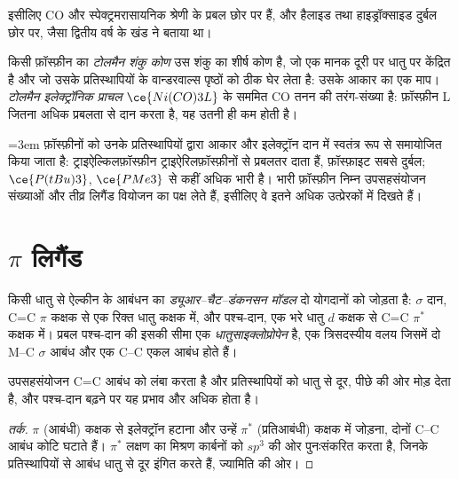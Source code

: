 इसीलिए CO और  स्पेक्ट्रमरासायनिक श्रेणी के प्रबल छोर पर हैं, और
हैलाइड तथा हाइड्रॉक्साइड दुर्बल छोर पर, जैसा द्वितीय वर्ष के खंड ने बताया था।

\begin{definition}[टोलमैन प्राचल]\label{def:b3:organometallic-bonding:tolman}
किसी फ़ॉस्फ़ीन का \emph{टोलमैन शंकु कोण} उस शंकु का शीर्ष
कोण है, जो एक मानक दूरी पर धातु पर केंद्रित है और जो उसके प्रतिस्थापियों के वान्डरवाल्स पृष्ठों को
ठीक घेर लेता है: उसके आकार का एक माप।
\emph{टोलमैन इलेक्ट्रॉनिक प्राचल}
$\ce{Ni(CO)3L}$ के सममित CO तनन की तरंग-संख्या है: फ़ॉस्फ़ीन L जितना अधिक प्रबलता से
दान करता है, यह उतनी ही कम होती है।
\end{definition}

\emergencystretch=3em फ़ॉस्फ़ीनों को उनके प्रतिस्थापियों द्वारा आकार और इलेक्ट्रॉन दान में स्वतंत्र रूप से
समायोजित किया जाता है: ट्राइऐल्किलफ़ॉस्फ़ीन ट्राइऐरिलफ़ॉस्फ़ीनों से प्रबलतर दाता हैं,
फ़ॉस्फ़ाइट सबसे दुर्बल; $\ce{P(tBu)3}$, $\ce{PMe3}$ से कहीं अधिक भारी है। भारी फ़ॉस्फ़ीन
निम्न उपसहसंयोजन संख्याओं और तीव्र लिगैंड वियोजन का पक्ष लेते हैं, इसीलिए वे
इतने अधिक उत्प्रेरकों में दिखते हैं।

\section{$\pi$ लिगैंड}

\begin{definition}[ड्यूआर--चैट--डंकनसन मॉडल]\label{def:b3:organometallic-bonding:dcd}
किसी धातु से ऐल्कीन के आबंधन का \emph{ड्यूआर--चैट--डंकनसन मॉडल}
दो योगदानों को जोड़ता है: $\sigma$ दान, C=C $\pi$ कक्षक से
एक रिक्त धातु कक्षक में, और पश्च-दान, एक भरे धातु $d$ कक्षक से
C=C $\pi^*$ कक्षक में। प्रबल पश्च-दान की इसकी सीमा एक
\emph{धातुसाइक्लोप्रोपेन} है, एक त्रिसदस्यीय वलय
जिसमें दो M--C $\sigma$ आबंध और एक C--C एकल आबंध होते हैं।
\end{definition}

\begin{proposition}[ऐल्कीन में पश्च-दान के परिणाम]\label{prop:b3:organometallic-bonding:dcd}
उपसहसंयोजन C=C आबंध को लंबा करता है और प्रतिस्थापियों को धातु से दूर, पीछे की ओर मोड़
देता है, और पश्च-दान बढ़ने पर यह प्रभाव और अधिक होता है।
\end{proposition}

\begin{proof}[तर्क]
$\pi$ (आबंधी) कक्षक से इलेक्ट्रॉन हटाना और उन्हें $\pi^*$
(प्रतिआबंधी) कक्षक में जोड़ना, दोनों C--C आबंध कोटि घटाते हैं। $\pi^*$ लक्षण का मिश्रण
कार्बनों को $sp^3$ की ओर पुनःसंकरित करता है, जिनके प्रतिस्थापियों से आबंध
धातु से दूर इंगित करते हैं,  ज्यामिति की ओर।
\end{proof}

